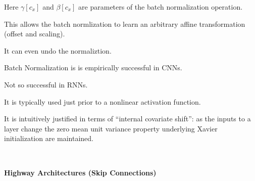 {\vfill
Here $\gamma[c_x]$ and $\beta[c_x]$ are parameters of the batch normalization operation.

\vfill
This allows the batch normlization to learn an arbitrary affine transformation (offset and scaling).

\vfill
It can even undo the normaliztion.


Batch Normalization is is empirically successful in CNNs.

\vfill
Not so successful in RNNs.

\vfill
It is typically used just prior to a nonlinear activation function.

\vfill
It is intuitively justified in terms of ``internal covariate shift'':
as the inputs to a layer change the zero mean unit variance property underlying Xavier initialization are maintained.


\vfill
\eject
~ \vfill
\centerline{\bf Highway Architectures (Skip Connections)}
\vfill
\vfill


}
